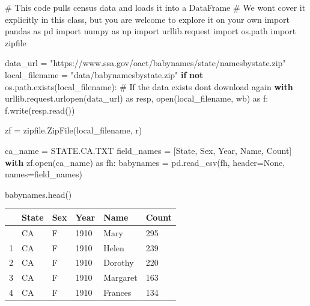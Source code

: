 \documentclass[
  letterpaper,
  DIV=11,
  numbers=noendperiod]{scrreprt}
\newenvironment{Shaded}{\begin{snugshade}}{\end{snugshade}}
\newcommand{\BuiltInTok}[1]{\textcolor[rgb]{0.00,0.23,0.31}{#1}}
\newcommand{\CommentTok}[1]{\textcolor[rgb]{0.37,0.37,0.37}{#1}}
\newcommand{\ControlFlowTok}[1]{\textcolor[rgb]{0.00,0.23,0.31}{\textbf{#1}}}
\newcommand{\ImportTok}[1]{\textcolor[rgb]{0.00,0.46,0.62}{#1}}
\newcommand{\KeywordTok}[1]{\textcolor[rgb]{0.00,0.23,0.31}{\textbf{#1}}}
\newcommand{\NormalTok}[1]{\textcolor[rgb]{0.00,0.23,0.31}{#1}}
\newcommand{\OperatorTok}[1]{\textcolor[rgb]{0.37,0.37,0.37}{#1}}
\newcommand{\StringTok}[1]{\textcolor[rgb]{0.13,0.47,0.30}{#1}}
\newcommand{\VariableTok}[1]{\textcolor[rgb]{0.07,0.07,0.07}{#1}}
\begin{document}
\begin{Shaded}
\begin{Highlighting}[]
\CommentTok{\# This code pulls census data and loads it into a DataFrame}
\CommentTok{\# We won\textquotesingle{}t cover it explicitly in this class, but you are welcome to explore it on your own}
\ImportTok{import}\NormalTok{ pandas }\ImportTok{as}\NormalTok{ pd}
\ImportTok{import}\NormalTok{ numpy }\ImportTok{as}\NormalTok{ np}
\ImportTok{import}\NormalTok{ urllib.request}
\ImportTok{import}\NormalTok{ os.path}
\ImportTok{import}\NormalTok{ zipfile}

\NormalTok{data\_url }\OperatorTok{=} \StringTok{"https://www.ssa.gov/oact/babynames/state/namesbystate.zip"}
\NormalTok{local\_filename }\OperatorTok{=} \StringTok{"data/babynamesbystate.zip"}
\ControlFlowTok{if} \KeywordTok{not}\NormalTok{ os.path.exists(local\_filename): }\CommentTok{\# If the data exists don\textquotesingle{}t download again}
    \ControlFlowTok{with}\NormalTok{ urllib.request.urlopen(data\_url) }\ImportTok{as}\NormalTok{ resp, }\BuiltInTok{open}\NormalTok{(local\_filename, }\StringTok{\textquotesingle{}wb\textquotesingle{}}\NormalTok{) }\ImportTok{as}\NormalTok{ f:}
\NormalTok{        f.write(resp.read())}

\NormalTok{zf }\OperatorTok{=}\NormalTok{ zipfile.ZipFile(local\_filename, }\StringTok{\textquotesingle{}r\textquotesingle{}}\NormalTok{)}

\NormalTok{ca\_name }\OperatorTok{=} \StringTok{\textquotesingle{}STATE.CA.TXT\textquotesingle{}}
\NormalTok{field\_names }\OperatorTok{=}\NormalTok{ [}\StringTok{\textquotesingle{}State\textquotesingle{}}\NormalTok{, }\StringTok{\textquotesingle{}Sex\textquotesingle{}}\NormalTok{, }\StringTok{\textquotesingle{}Year\textquotesingle{}}\NormalTok{, }\StringTok{\textquotesingle{}Name\textquotesingle{}}\NormalTok{, }\StringTok{\textquotesingle{}Count\textquotesingle{}}\NormalTok{]}
\ControlFlowTok{with}\NormalTok{ zf.}\BuiltInTok{open}\NormalTok{(ca\_name) }\ImportTok{as}\NormalTok{ fh:}
\NormalTok{    babynames }\OperatorTok{=}\NormalTok{ pd.read\_csv(fh, header}\OperatorTok{=}\VariableTok{None}\NormalTok{, names}\OperatorTok{=}\NormalTok{field\_names)}

\NormalTok{babynames.head()}
\end{Highlighting}
\end{Shaded}

\begin{longtable}[]{@{}llllll@{}}
\toprule\noalign{}
& State & Sex & Year & Name & Count \\
\midrule\noalign{}
\endhead
\bottomrule\noalign{}
\endlastfoot
0 & CA & F & 1910 & Mary & 295 \\
1 & CA & F & 1910 & Helen & 239 \\
2 & CA & F & 1910 & Dorothy & 220 \\
3 & CA & F & 1910 & Margaret & 163 \\
4 & CA & F & 1910 & Frances & 134 \\
\end{longtable}
\end{document}
